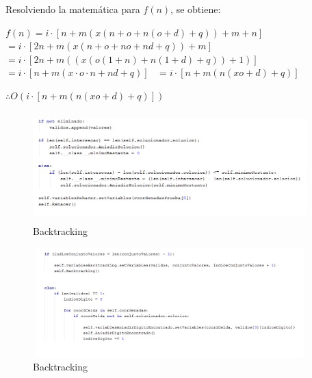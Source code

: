\documentclass[journal]{IEEEtran}
\begin{document}
\begin{itemize}
		Resolviendo la matemática para $f(n)$, se obtiene: \
		
		\begin{center}
			$ f(n) = i \cdot [n + m(x(n + o + n(o + d) + q)) + m + n] $ \
			$ = i \cdot [2n + m(x(n + o + no + nd + q)) + m] $ \
			$ = i \cdot [2n + m((x(o(1 + n) + n(1 + d) + q)) + 1)] $ \
			$ = i \cdot [n + m(x \cdot o \cdot n + nd + q)] $ \
			$ = i \cdot [n + m(n(xo + d) + q)] $ \
			
		\end{center}
		
		$\therefore O(i \cdot [n + m(n(xo + d) + q)]) $ \
		
		
		\begin{figure}[h]
			\centering
			\includegraphics[height= 120pt, width=300pt]{BT3.png}
			\caption{Backtracking}
		\end{figure}
	
		\begin{figure}[h]
			\centering
			\includegraphics[height= 120pt, width=300pt]{BT4.png}
			\caption{Backtracking}
		\end{figure}
	
	\end{itemize}
		

	
		


\newpage
\end{document}
